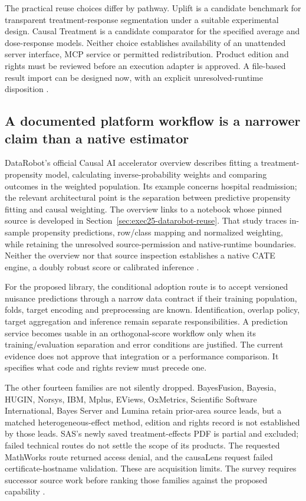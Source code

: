 The practical reuse choices differ by pathway. Uplift is a candidate
benchmark for transparent treatment-response segmentation under a suitable
experimental design. Causal Treatment is a candidate comparator for the
specified average and dose-response models. Neither choice establishes
availability of an unattended server interface, MCP service or permitted
redistribution. Product edition and rights must be reviewed before an
execution adapter is approved. A file-based result import can be designed
now, with an explicit unresolved-runtime disposition
\cite{exec13_ch_scope}.

\subsection{A documented platform workflow is a narrower claim than a native estimator}

DataRobot's official Causal AI accelerator overview describes fitting a
treatment-propensity model, calculating inverse-probability weights and
comparing outcomes in the weighted population. Its example concerns
hospital readmission; the relevant architectural point is the separation
between predictive propensity fitting and causal weighting. The overview links to a notebook whose pinned source is developed in
Section~\ref{sec:exec25-datarobot-reuse}. That study traces in-sample propensity
predictions, row/class mapping and normalized weighting, while retaining the
unresolved source-permission and native-runtime boundaries. Neither the
overview nor that source inspection establishes a native CATE engine, a
doubly robust score or calibrated inference
\cite{exec13_ch_datarobot}.

For the proposed library, the conditional adoption route is to accept
versioned nuisance predictions through a narrow data contract if their
training population, folds, target encoding and preprocessing are known.
Identification, overlap policy, target aggregation and inference remain
separate responsibilities. A prediction service becomes usable in an
orthogonal-score workflow only when its training/evaluation separation
and error conditions are justified. The current evidence does not approve
that integration or a performance comparison. It specifies what code and
rights review must precede one.

The other fourteen families are not silently dropped. BayesFusion, Bayesia,
HUGIN, Norsys, IBM, Mplus, EViews, OxMetrics, Scientific Software
International, Bayes Server and Lumina retain prior-area source leads,
but a matched heterogeneous-effect method, edition and rights record is
not established by those leads. SAS's newly saved treatment-effects PDF
is partial and excluded; failed technical routes do not settle the scope
of its products. The requested MathWorks route returned access denial,
and the causaLens request failed certificate-hostname validation. These
are acquisition limits. The survey requires successor source work before
ranking those families against the proposed capability
\cite{exec13_ch_scope}.

